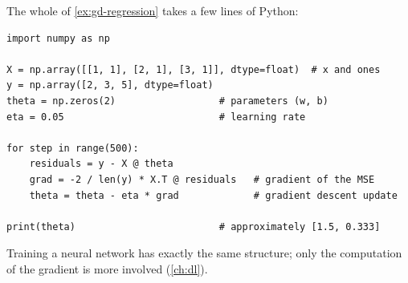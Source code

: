 \begin{remark}
The whole of \cref{ex:gd-regression} takes a few lines of Python:
\par\noindent\begin{minipage}{\linewidth}
\begin{lstlisting}
import numpy as np

X = np.array([[1, 1], [2, 1], [3, 1]], dtype=float)  # x and ones
y = np.array([2, 3, 5], dtype=float)
theta = np.zeros(2)                  # parameters (w, b)
eta = 0.05                           # learning rate

for step in range(500):
    residuals = y - X @ theta
    grad = -2 / len(y) * X.T @ residuals   # gradient of the MSE
    theta = theta - eta * grad             # gradient descent update

print(theta)                         # approximately [1.5, 0.333]
\end{lstlisting}
\end{minipage}\par
Training a neural network has exactly the same structure; only the computation
of the gradient is more involved (\cref{ch:dl}).
\end{remark}

